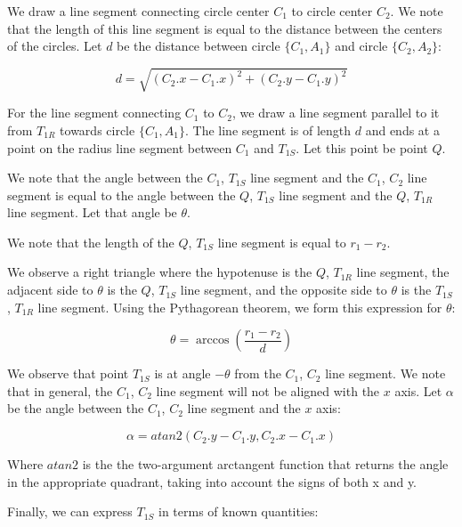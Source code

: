 \documentclass{article}
\begin{document}
We draw a line segment connecting circle center $C_1$ to circle center $C_2$. We note that the length of this line segment is equal to the distance between the centers of the circles. Let $d$ be the distance between circle $\{C_1, A_1\}$ and circle $\{C_2, A_2\}$:

\begin{equation}
    \label{eq:d}
    d = \sqrt{(C_2.x - C_1.x)^2 + (C_2.y - C_1.y)^2}
\end{equation}

For the line segment connecting $C_1$ to $C_2$, we draw a line segment parallel to it from $T_{1R}$ towards circle $\{C_1, A_1\}$. The line segment is of length $d$ and ends at a point on the radius line segment between $C_1$ and $T_{1S}$. Let this point be point $Q$.

We note that the angle between the $C_1$, $T_{1S}$ line segment and the $C_1$, $C_2$ line segment is equal to the angle between the $Q$, $T_{1S}$ line segment and the $Q$, $T_{1R}$ line segment. Let that angle be $\theta$.

We note that the length of the $Q$, $T_{1S}$ line segment is equal to $r_1 - r_2$.

We observe a right triangle where the hypotenuse is the $Q$, $T_{1R}$ line segment, the adjacent side to $\theta$ is the $Q$, $T_{1S}$ line segment, and the opposite side to $\theta$ is the $T_{1S}$,  $T_{1R}$ line segment. Using the Pythagorean theorem, we form this expression for $\theta$:

\begin{equation}
    \label{eq:theta}
    \theta = \arccos\left(\frac{r_1 - r_2}{d}\right)
\end{equation}

We observe that point $T_{1S}$ is at angle $-\theta$ from the $C_1$, $C_2$ line segment. We note that in general, the $C_1$, $C_2$ line segment will not be aligned with the $x$ axis. Let $\alpha$ be the angle between the $C_1$, $C_2$ line segment and the $x$ axis:

\begin{equation}
    \label{eq:alpha}
    \alpha = atan2(C_2.y - C_1.y, C_2.x - C_1.x)
\end{equation}

Where $atan2$ is the the two-argument arctangent function that returns the angle in the appropriate quadrant, taking into account the signs of both x and y.

Finally, we can express $T_{1S}$ in terms of known quantities:
\end{document}
